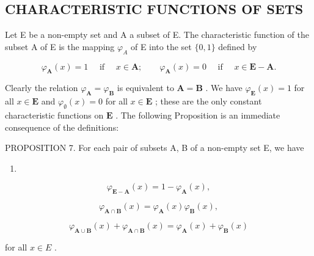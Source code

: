 \subsection{CHARACTERISTIC FUNCTIONS OF SETS}

Let E be a non-empty set and A a subset of E. The characteristic function of the subset A of E is the mapping \(\varphi_{A}\) of E into the set \(\{0, 1\}\) defined by

\[
\varphi_ {\mathbf {A}} (x) = 1 \quad \text { if } \quad x \in \mathbf {A}; \qquad \varphi_ {\mathbf {A}} (x) = 0 \quad \text { if } \quad x \in \mathbf {E} - \mathbf {A}.
\]

Clearly the relation \(\varphi_{\mathbf{A}} = \varphi_{\mathbf{B}}\) is equivalent to \(\mathbf{A} = \mathbf{B}\) . We have \(\varphi_{\mathbf{E}}(x) = 1\) for all \(x \in \mathbf{E}\) and \(\varphi_{\emptyset}(x) = 0\) for all \(x \in \mathbf{E}\) ; these are the only constant characteristic functions on \(\mathbf{E}\) . The following Proposition is an immediate consequence of the definitions:

PROPOSITION 7. For each pair of subsets A, B of a non-empty set E, we have

\begin{enumerate}
\def\labelenumi{(\arabic{enumi})}
\tightlist
\item
\end{enumerate}

\[
\varphi_ {\mathbf {E} - \mathbf {A}} (x) = 1 - \varphi_ {\mathbf {A}} (x),\tag{2}
\]

\[
\varphi_ {\mathbf {A} \cap \mathbf {B}} (x) = \varphi_ {\mathbf {A}} (x) \varphi_ {\mathbf {B}} (x),\tag{3}
\]

\[
\varphi_ {\mathbf {A} \cup \mathbf {B}} (x) + \varphi_ {\mathbf {A} \cap \mathbf {B}} (x) = \varphi_ {\mathbf {A}} (x) + \varphi_ {\mathbf {B}} (x)
\]

for all \(x \in E\) .

